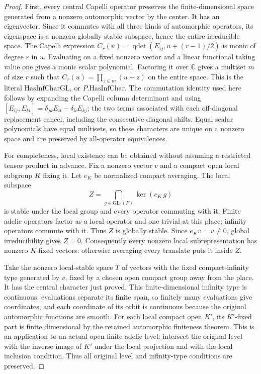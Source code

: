 \documentclass[11pt,a4paper]{article}
\numberwithin{equation}{section}
\theoremstyle{remark}\newtheorem{remark}[theorem]{Remark}
\begin{document}
\begin{proof}
First, every central Capelli operator preserves the finite-dimensional
space generated from a nonzero automorphic vector by the center.
It has an eigenvector.  Since it commutes with all three kinds of
automorphic operators, its eigenspace is a nonzero globally stable
subspace, hence the entire irreducible space.  The Capelli expression
\(C_r(u)=\operatorname{qdet}(E_{ij},u+(r-1)/2)\) is monic of
degree \(r\) in \(u\).  Evaluating on a fixed nonzero vector and
a linear functional taking value one gives a monic scalar polynomial.
Factoring it over \(\mathbb C\) gives a multiset \(m\) of size
\(r\) such that
\(C_r(u)=\prod_{z\in m}(u+z)\) on the entire space.  This is the
literal \(\mathrm{HasInfCharGL}\), or \(P.\mathrm{HasInfChar}\).
The commutation identity used here follows by expanding the Capelli
column determinant and using
\([E_{ij},E_{kl}]=\delta_{jk}E_{il}-\delta_{li}E_{kj}\);
the two terms associated with each off-diagonal replacement cancel,
including the consecutive diagonal shifts.  Equal scalar polynomials
have equal multisets, so these characters are unique on a nonzero
space and are preserved by all-operator equivalences.

For completeness, local existence can be obtained without assuming
a restricted tensor product in advance.  Fix a nonzero vector \(v\)
and a compact open local subgroup \(K\) fixing it.  Let \(e_K\)
be normalized compact averaging.  The local subspace
\[
                  Z=\bigcap_{g\in\mathrm{GL}_r(F)}
                       \ker(e_K\,g)
 \tag{BCS.8}
\]
is stable under the local group and every operator commuting with
it.  Finite adelic operators factor as a local operator and one
trivial at this place; infinity operators commute with it.  Thus
\(Z\) is globally stable.  Since \(e_Kv=v\ne0\), global
irreducibility gives \(Z=0\).  Consequently every nonzero local
subrepresentation has nonzero \(K\)-fixed vectors: otherwise
averaging every translate puts it inside \(Z\).

Take the nonzero local-stable space \(T\) of vectors with the
fixed compact-infinity type generated by \(v\), fixed by a chosen
open compact group away from the place.  It has the central
character just proved.  This finite-dimensional infinity type is
continuous: evaluations separate its finite span, so finitely many
evaluations give coordinates, and each coordinate of its orbit is
continuous because the original automorphic functions are smooth.
For each local compact open \(K'\), its
\(K'\)-fixed part is finite dimensional by the retained automorphic
finiteness theorem.  This is an application to an actual open finite
adelic level: intersect the original level with the inverse image of
\(K'\) under the local projection and with the local inclusion
condition.  Thus all original level and infinity-type conditions are
preserved.


\end{proof}
\end{document}
